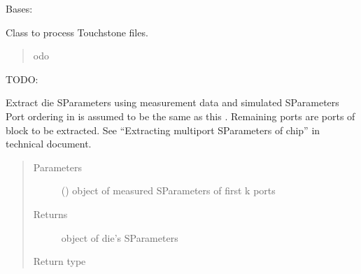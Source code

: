 \documentclass[letterpaper,10pt,english]{sphinxmanual}
\begin{document}
\begin{fulllineitems}
\label{\detokenize{touchstone:touchstone.spfile}}
Bases: 

Class to process Touchstone files.
\begin{quote}

odo
\end{quote}

TODO:

\begin{fulllineitems}
\label{\detokenize{touchstone:touchstone.spfile.Extraction}}
Extract die S\sphinxhyphen{}Parameters using measurement data and simulated S\sphinxhyphen{}Parameters
Port ordering in  is assumed to be the same as this .
Remaining ports are ports of block to be extracted.
See “Extracting multiport S\sphinxhyphen{}Parameters of chip” in technical document.
\begin{quote}\begin{description}
\item[{Parameters}] \leavevmode
{} ({\hyperref[\detokenize{touchstone:touchstone.spfile}]{}}) \textendash{}  object of measured S\sphinxhyphen{}Parameters of first k ports

\item[{Returns}] \leavevmode
{} object of die’s S\sphinxhyphen{}Parameters

\item[{Return type}] \leavevmode
{\hyperref[\detokenize{touchstone:touchstone.spfile}]{}}

\end{description}\end{quote}


\end{fulllineitems}
\end{fulllineitems}
\end{document}
